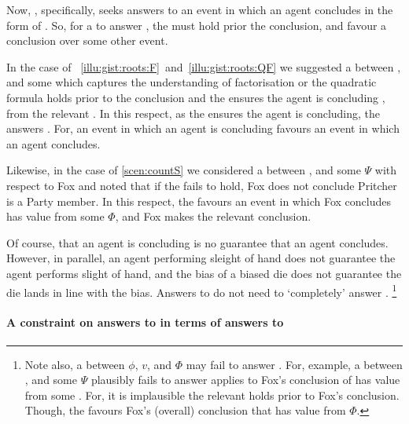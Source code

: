 \begin{note}
  Now, \qWhy{}, specifically, seeks answers to an event in which an agent concludes in the form of .
  So, for a \ros{} to answer \qWhy{}, the \ros{} must hold prior the \agents{} conclusion, and favour a conclusion over some other event.

  In the case of ~\ref{illu:gist:roots:F}~and~\ref{illu:gist:roots:QF} we suggested a \ros{} between \propM{\rootsCon{}},  and some \pool{} which captures the \agents{} understanding of factorisation or the quadratic formula holds prior to the \agents{} conclusion and the \ros{} ensures the agent is concluding \propM{\rootsCon{}},  from the relevant \pool{}.
  In this respect, as the \ros{} ensures the agent is concluding, the \ros{} answers \qWhy{}.
  For, an event in which an agent is concluding favours an event in which an agent concludes.

  Likewise, in the case of \autoref{scen:countS} we considered a \ros{} between ,  and some \pool{} \(\Psi\) with respect to Fox and noted that if the \ros{} fails to hold, Fox does not conclude Pritcher is a Party member.
  In this respect, the \ros{} favours an event in which Fox concludes \propI{\signConA{}} has value  from some \pool{} \(\Phi\), and Fox makes the relevant conclusion.

  Of course, that an agent is concluding is no guarantee that an agent concludes.
  However, in parallel, an agent performing sleight of hand does not guarantee the agent performs slight of hand, and the bias of a biased die does not guarantee the die lands in line with the bias.
  Answers to \qWhy{} do not need to `completely' answer \qWhy{}.%
  \footnote{
    Note also, a \ros{} between \(\phi\), \(v\), and \(\Phi\) may fail to answer \qWhy{}.
    For, example, a \ros{} between ,  and some \pool{} \(\Psi\) plausibly fails to answer \qWhy{} applies to Fox's conclusion of  has value  from some \pool{}.
    For, it is implausible the relevant \ros{} holds prior to Fox's conclusion.
    Though, the \ros{} favours Fox's (overall) conclusion that \propI{\signConA{}} has value  from \(\Phi\).
  }
\end{note}



\paragraph*{A constraint on answers to \qWhy{} in terms of answers to \qHow{}}


